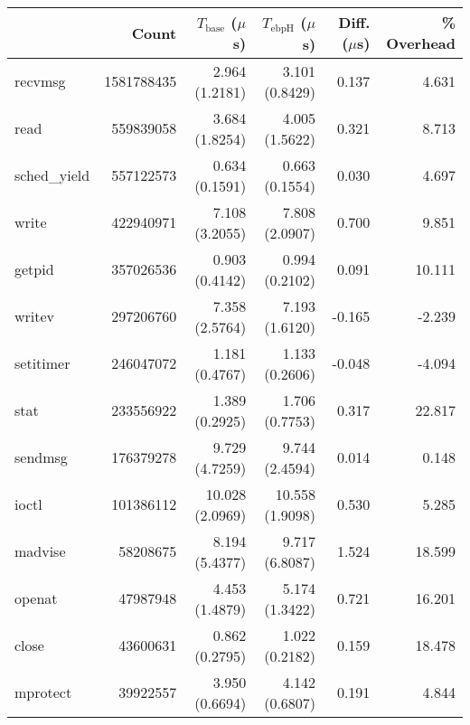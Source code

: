 \begin{tabular}{>{\ttfamily}lrrrrr}
\toprule
\multicolumn{1}{l}{System Call} &       Count & $T_\text{base}$ ($\mu$s) & $T_\text{ebpH}$ ($\mu$s) &  Diff. ($\mu$s) &  \% Overhead \\
\midrule
                        recvmsg &  1581788435 &           2.964 (1.2181) &           3.101 (0.8429) &           0.137 &        4.631 \\
                           read &   559839058 &           3.684 (1.8254) &           4.005 (1.5622) &           0.321 &        8.713 \\
                   sched\_yield &   557122573 &           0.634 (0.1591) &           0.663 (0.1554) &           0.030 &        4.697 \\
                          write &   422940971 &           7.108 (3.2055) &           7.808 (2.0907) &           0.700 &        9.851 \\
                         getpid &   357026536 &           0.903 (0.4142) &           0.994 (0.2102) &           0.091 &       10.111 \\
                         writev &   297206760 &           7.358 (2.5764) &           7.193 (1.6120) &          -0.165 &       -2.239 \\
                      setitimer &   246047072 &           1.181 (0.4767) &           1.133 (0.2606) &          -0.048 &       -4.094 \\
                           stat &   233556922 &           1.389 (0.2925) &           1.706 (0.7753) &           0.317 &       22.817 \\
                        sendmsg &   176379278 &           9.729 (4.7259) &           9.744 (2.4594) &           0.014 &        0.148 \\
                          ioctl &   101386112 &          10.028 (2.0969) &          10.558 (1.9098) &           0.530 &        5.285 \\
                        madvise &    58208675 &           8.194 (5.4377) &           9.717 (6.8087) &           1.524 &       18.599 \\
                         openat &    47987948 &           4.453 (1.4879) &           5.174 (1.3422) &           0.721 &       16.201 \\
                          close &    43600631 &           0.862 (0.2795) &           1.022 (0.2182) &           0.159 &       18.478 \\
                       mprotect &    39922557 &           3.950 (0.6694) &           4.142 (0.6807) &           0.191 &        4.844 \\

\end{tabular}
